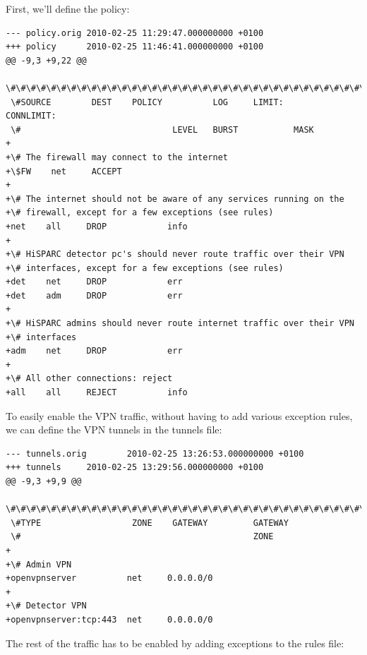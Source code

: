 \documentclass[a4paper,11pt,english]{sphinxmanual}
\begin{document}
First, we'll define the policy:

\begin{Verbatim}[commandchars=\\\{\}]
--- policy.orig 2010-02-25 11:29:47.000000000 +0100
+++ policy      2010-02-25 11:46:41.000000000 +0100
@@ -9,3 +9,22 @@
 \#\#\#\#\#\#\#\#\#\#\#\#\#\#\#\#\#\#\#\#\#\#\#\#\#\#\#\#\#\#\#\#\#\#\#\#\#\#\#\#\#\#\#\#\#\#\#\#\#\#\#\#\#\#\#\#\#\#\#\#\#\#\#\#\#\#\#\#\#\#\#\#\#\#\#\#\#\#\#
 \#SOURCE        DEST    POLICY          LOG     LIMIT:          CONNLIMIT:
 \#                              LEVEL   BURST           MASK
+
+\# The firewall may connect to the internet
+\$FW    net     ACCEPT
+
+\# The internet should not be aware of any services running on the
+\# firewall, except for a few exceptions (see rules)
+net    all     DROP            info
+
+\# HiSPARC detector pc's should never route traffic over their VPN
+\# interfaces, except for a few exceptions (see rules)
+det    net     DROP            err
+det    adm     DROP            err
+
+\# HiSPARC admins should never route internet traffic over their VPN
+\# interfaces
+adm    net     DROP            err
+
+\# All other connections: reject
+all    all     REJECT          info
\end{Verbatim}

To easily enable the VPN traffic, without having to add various exception rules, we can define the VPN tunnels in the tunnels file:

\begin{Verbatim}[commandchars=\\\{\}]
--- tunnels.orig        2010-02-25 13:26:53.000000000 +0100
+++ tunnels     2010-02-25 13:29:56.000000000 +0100
@@ -9,3 +9,9 @@
 \#\#\#\#\#\#\#\#\#\#\#\#\#\#\#\#\#\#\#\#\#\#\#\#\#\#\#\#\#\#\#\#\#\#\#\#\#\#\#\#\#\#\#\#\#\#\#\#\#\#\#\#\#\#\#\#\#\#\#\#\#\#\#\#\#\#\#\#\#\#\#\#\#\#\#\#\#\#\#
 \#TYPE                  ZONE    GATEWAY         GATEWAY
 \#                                              ZONE
+
+\# Admin VPN
+openvpnserver          net     0.0.0.0/0
+
+\# Detector VPN
+openvpnserver:tcp:443  net     0.0.0.0/0
\end{Verbatim}

The rest of the traffic has to be enabled by adding exceptions to the rules file:
\end{document}

